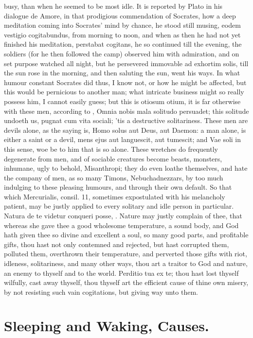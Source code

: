 {{busy, than when he seemed to be most idle. It is reported by Plato in
his dialogue de Amore, in that prodigious commendation of Socrates, how
a deep meditation coming into Socrates' mind by chance, he stood still
musing, eodem vestigio cogitabundus, from morning to noon, and when as
then he had not yet finished his meditation, perstabat cogitans, he so
continued till the evening, the soldiers (for he then followed the
camp) observed him with admiration, and on set purpose watched all
night, but he persevered immovable ad exhortim solis, till the sun rose
in the morning, and then saluting the sun, went his ways. In what
humour constant Socrates did thus, I know not, or how he might be
affected, but this would be pernicious to another man; what intricate
business might so really possess him, I cannot easily guess; but this
is otiosum otium, it is far otherwise with these men, according to
\Seneca, Omnia nobis mala solitudo persuadet; this solitude undoeth us,
pugnat cum vita sociali; 'tis a destructive solitariness. These men are
devils alone, as the saying is, Homo solus aut Deus, aut Daemon: a man
alone, is either a saint or a devil, mens ejus aut languescit, aut
tumescit; and Vae soli in this sense, woe be to him that is so
alone. These wretches do frequently degenerate from men, and of
sociable creatures become beasts, monsters, inhumane, ugly to behold,
Misanthropi; they do even loathe themselves, and hate the company of
men, as so many Timons, Nebuchadnezzars, by too much indulging to these
pleasing humours, and through their own default. So that which
Mercurialis, consil. 11, sometimes expostulated with his melancholy
patient, may be justly applied to every solitary and idle person in
particular. Natura de te videtur conqueri posse, \etc{}. Nature may
justly complain of thee, that whereas she gave thee a good wholesome
temperature, a sound body, and God hath given thee so divine and
excellent a soul, so many good parts, and profitable gifts, thou hast
not only contemned and rejected, but hast corrupted them, polluted
them, overthrown their temperature, and perverted those gifts with
riot, idleness, solitariness, and many other ways, thou art a traitor
to God and nature, an enemy to thyself and to the world. Perditio tua
ex te; thou hast lost thyself wilfully, cast away thyself, thou thyself
art the efficient cause of thine own misery, by not resisting such vain
cogitations, but giving way unto them.

\section{Sleeping and Waking, Causes.}

}}
